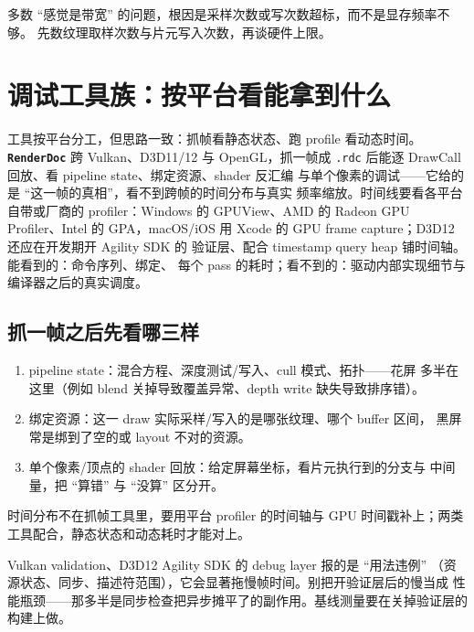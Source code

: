 \documentclass[12pt,a4paper,fontset=fandol]{ctexbook}
\newcommand{\Tp}[1]{\texttt{#1}}
\newcommand{\Lib}[1]{\textbf{\texttt{#1}}}
\begin{document}
\begin{note}[title={测带宽要先测采样率而非频率}]
多数 ``感觉是带宽'' 的问题，根因是采样次数或写次数超标，而不是显存频率不够。
先数纹理取样次数与片元写入次数，再谈硬件上限。
\end{note}

\section{调试工具族：按平台看能拿到什么}

工具按平台分工，但思路一致：抓帧看静态状态、跑 profile 看动态时间。
\Lib{RenderDoc} 跨 Vulkan、D3D11/12 与 OpenGL，抓一帧成
\Tp{.rdc} 后能逐 DrawCall 回放、看 pipeline state、绑定资源、shader 反汇编
与单个像素的调试——它给的是 ``这一帧的真相''，看不到跨帧的时间分布与真实
频率缩放。时间线要看各平台自带或厂商的 profiler：Windows 的
GPUView、AMD 的 Radeon GPU Profiler、Intel 的 GPA，macOS/iOS 用
Xcode 的 GPU frame capture；D3D12 还应在开发期开 Agility SDK 的
验证层、配合 timestamp query heap 铺时间轴。能看到的：命令序列、绑定、
每个 pass 的耗时；看不到的：驱动内部实现细节与编译器之后的真实调度。

\subsection{抓一帧之后先看哪三样}

\begin{enumerate}
  \item pipeline state：混合方程、深度测试/写入、cull 模式、拓扑——花屏
        多半在这里（例如 blend 关掉导致覆盖异常、depth write 缺失导致排序错）。
  \item 绑定资源：这一 draw 实际采样/写入的是哪张纹理、哪个 buffer 区间，
        黑屏常是绑到了空的或 layout 不对的资源。
  \item 单个像素/顶点的 shader 回放：给定屏幕坐标，看片元执行到的分支与
        中间量，把 ``算错'' 与 ``没算'' 区分开。
\end{enumerate}
时间分布不在抓帧工具里，要用平台 profiler 的时间轴与 GPU 时间戳补上；两类
工具配合，静态状态和动态耗时才能对上。

\begin{warning}[title={验证层消息不等于性能问题}]
Vulkan validation、D3D12 Agility SDK 的 debug layer 报的是 ``用法违例''
（资源状态、同步、描述符范围），它会显著拖慢帧时间。别把开验证层后的慢当成
性能瓶颈——那多半是同步检查把异步摊平了的副作用。基线测量要在关掉验证层的
构建上做。
\end{warning}
\end{document}
